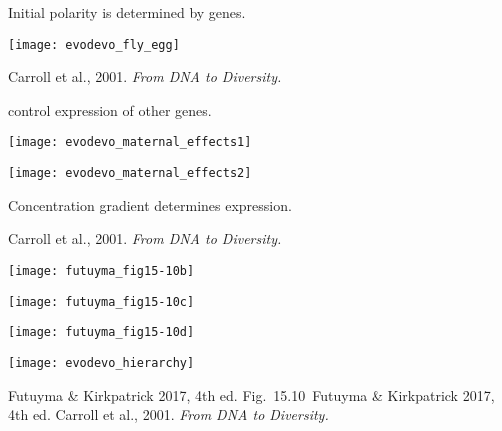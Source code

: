\documentclass[t,handout]{beamer}  %
\newcommand{\futuyma}[1]{%
	\ifthenelse{\isempty{#1}}%
	{Futuyma \& Kirkpatrick 2017, 4th ed.}%
	{Fig.~#1~Futuyma \& Kirkpatrick 2017, 4th ed.}%
}
\newcommand{\backskip}{\vspace{-0.5\baselineskip}}
\begin{document}

\begin{frame}{Initial polarity is determined by  genes.}

\backskip


\centering

\texttt{[image: evodevo\_fly\_egg]}

\tinyfill Carroll et al., 2001. \textit{From DNA to Diversity.}


\end{frame}


\begin{frame}{ control expression of other genes.}

\vspace{-\baselineskip}

\begin{multicols}{2}

\texttt{[image: evodevo\_maternal\_effects1]}

\columnbreak

\texttt{[image: evodevo\_maternal\_effects2]}

\end{multicols}

\hangpara Concentration gradient determines expression.

\tinyfill Carroll et al., 2001. \textit{From DNA to Diversity.}


\end{frame}


\begin{frame}

\begin{multicols}{2}

\centering

\texttt{[image: futuyma\_fig15-10b]}

\texttt{[image: futuyma\_fig15-10c]}

\texttt{[image: futuyma\_fig15-10d]}

\columnbreak

\texttt{[image: evodevo\_hierarchy]}
\end{multicols}

\vfilll

\tiny \futuyma{15.10} \hfill Carroll et al., 2001. \textit{From DNA to Diversity.}


\end{frame}
\end{document}
